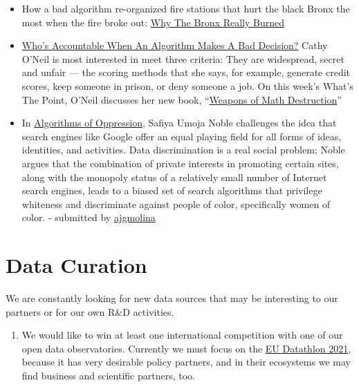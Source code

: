 \documentclass[
  fontsize=13pt,
  english,
  a4paper,
  openany, a4paper, oneside]{book}
\providecommand{\tightlist}{%
  \setlength{\itemsep}{0pt}\setlength{\parskip}{0pt}}
\begin{document}
\begin{itemize}
\item
  How a bad algorithm re-organized fire stations that hurt the black Bronx the most when the fire broke out: \href{https://fivethirtyeight.com/features/why-the-bronx-really-burned/}{Why The Bronx Really Burned}
\item
  \href{https://fivethirtyeight.com/features/whos-accountable-when-an-algorithm-makes-a-bad-decision/}{Who's Accountable When An Algorithm Makes A Bad Decision?} Cathy O'Neil is most interested in meet three criteria: They are widespread, secret and unfair --- the scoring methods that she says, for example, generate credit scores, keep someone in prison, or deny someone a job. On this week's What's The Point, O'Neil discusses her new book, ``\href{https://weaponsofmathdestructionbook.com/}{Weapons of Math Destruction}''
\item
  In \href{https://nyupress.org/9781479837243/algorithms-of-oppression/}{Algorithms of Oppression}, Safiya Umoja Noble challenges the idea that search engines like Google offer an equal playing field for all forms of ideas, identities, and activities. Data discrimination is a real social problem; Noble argues that the combination of private interests in promoting certain sites, along with the monopoly status of a relatively small number of Internet search engines, leads to a biased set of search algorithms that privilege whiteness and discriminate against people of color, specifically women of color. - submitted by \href{https://keybase.io/ajgmolina}{ajgmolina}
\end{itemize}

\hypertarget{data-curation}{%
\chapter{Data Curation}\label{data-curation}}

We are constantly looking for new data sources that may be interesting to our partners or for our own R\&D activities.

\begin{enumerate}
\def\labelenumi{\arabic{enumi}.}
\tightlist
\item
  We would like to win at least one international competition with one of our open data observatories. Currently we must focus on the \protect\hyperlink{eu-datathlon}{EU Datathlon 2021}, because it has very desirable policy partners, and in their ecosystems we may find business and scientific partners, too.
\end{enumerate}
\end{document}
